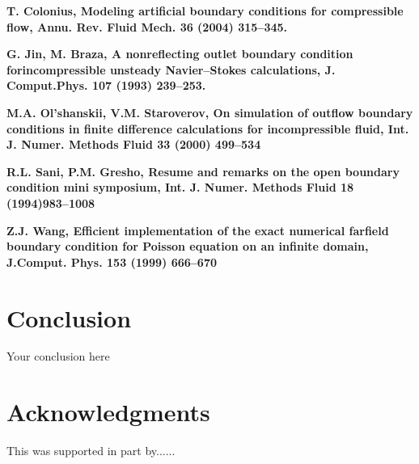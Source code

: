\documentclass{article}
\begin{document}
\textbf{T. Colonius, Modeling artificial boundary conditions for compressible flow, Annu. Rev. Fluid Mech. 36 (2004) 315–345.}

\textbf{G. Jin, M. Braza, A nonreflecting outlet boundary condition forincompressible unsteady Navier–Stokes calculations, J. Comput.Phys. 107 (1993) 239–253.}

\textbf{M.A. Ol’shanskii, V.M. Staroverov, On simulation of outflow boundary conditions in finite difference calculations for incompressible fluid, Int. J. Numer. Methods Fluid 33 (2000) 499–534}

\textbf{R.L. Sani, P.M. Gresho, Resume and remarks on the open boundary condition mini symposium, Int. J. Numer. Methods Fluid 18 (1994)983–1008}

\textbf{Z.J. Wang, Efficient implementation of the exact numerical farfield boundary condition for Poisson equation on an infinite domain, J.Comput. Phys. 153 (1999) 666–670}
 
\section{Conclusion}
Your conclusion here

\section*{Acknowledgments}
This was supported in part by......

  
  
\end{document}
